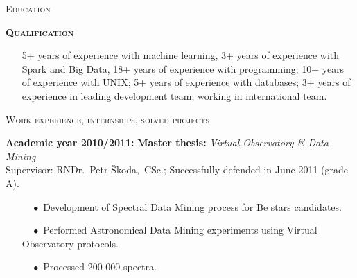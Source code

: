 \documentclass[10pt]{article}
\begin{document}
\begin{cv}
\begin{cvlist}{\large \textsc{Education}}
   \item {\bf{\textsc{Qualification}}} \begin{itemize}
    \item[] \vspace{-0.3cm} 5+ years of experience with machine learning, 3+ years of experience with Spark and Big Data, 18+ years of experience with programming; 10+
      years of experience with UNIX; 5+ years of experience with
      databases; 3+ years of experience in leading development team;
      working in international team.

   \end{itemize}  
\end{cvlist}






\noindent\hrulefill
\begin{cvlist}{\large \textsc{Work experience, internships, solved projects}}

\item {\bf{Academic year 2010/2011:}} \textbf{Master thesis:}
  \textit{Virtual Observatory \& Data Mining}\\Supervisor: RNDr.~Petr Škoda,~CSc.; Successfully defended in June 2011 (grade A).
\vspace{-0.3cm}
\begin{itemize}
\item[$\quad \bullet$ \hspace{-1.5mm}] Development of Spectral Data
  Mining process for Be stars candidates.
\item[$\quad \bullet$ \hspace{-1.5mm}] Performed Astronomical Data
  Mining experiments using Virtual Observatory protocols.
\item[$\quad \bullet$ \hspace{-1.5mm}] Processed 200 000 spectra.




\end{itemize}
\end{cvlist}
\end{cv}
\end{document}
